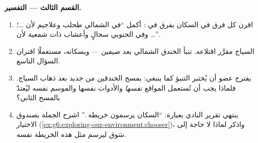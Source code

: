 \begin{problem}
\medskip\noindent\textbf{القسم الثالث --- التفسير.}
\begin{enumerate}[resume]
  \item اقرن كل فرق في السكان بفرق في : أكمل ``في الشمالي
        طحلب وعلاجيم لأن \dots؛ وفي الجنوبي سحالٍ وأعشاب ذات
         شمعية لأن \dots''.
  \item السياج مقرَّر اقتلاعه. تنبأ  الخندق الشمالي بعد
        صيفين --- وبسكانه، مستعملًا اقتران السؤال التاسع.
  \item يقترح عضو أن يُختبر التنبؤ كما ينبغي: بمسح الخندقين من
        جديد بعد ذهاب السياج. فلماذا يجب أن تُستعمل المواقع
        \emph{نفسها} والأدوات نفسها والموسم نفسه ليُعتدّ بالمسح
        الثاني؟
  \item ينتهي تقرير النادي بعبارة: ``السكان يرسمون خريطة
        .'' اشرح الجملة بصندوق الاختيار
        (\cref{ex:g6:exploring-our-environment:chooser})، واذكر
        لماذا لا حاجة إلى سَوق ليرسم مثل هذه الخريطة نفسه.
\end{enumerate}
\end{problem}
